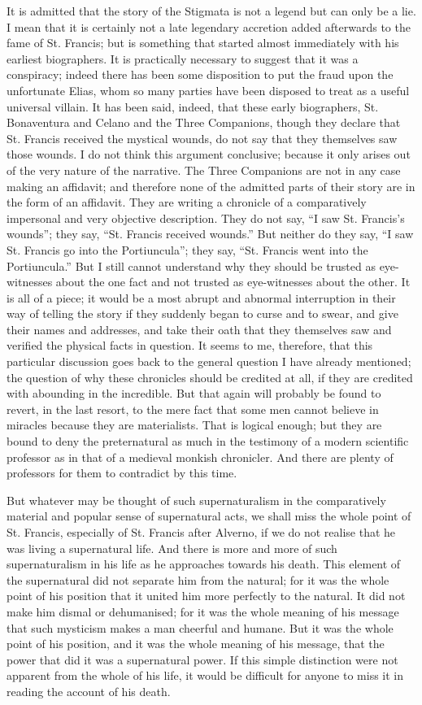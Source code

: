 \documentclass{book}
\begin{document}
It is admitted that the story of the Stigmata is not a legend but can only be a lie. I mean that it is certainly not a late legendary accretion added afterwards to the fame of St. Francis; but is something that started almost immediately with his earliest biographers. It is practically necessary to suggest that it was a conspiracy; indeed there has been some disposition to put the fraud upon the unfortunate Elias, whom so many parties have been disposed to treat as a useful universal villain. It has been said, indeed, that these early biographers, St. Bonaventura and Celano and the Three Companions, though they declare that St. Francis received the mystical wounds, do not say that they themselves saw those wounds. I do not think this argument conclusive; because it only arises out of the very nature of the narrative. The Three Companions are not in any case making an affidavit; and therefore none of the admitted parts of their story are in the form of an affidavit. They are writing a chronicle of a comparatively impersonal and very objective description. They do not say, “I saw St. Francis’s wounds”; they say, “St. Francis received wounds.” But neither do they say, “I saw St. Francis go into the Portiuncula”; they say, “St. Francis went into the Portiuncula.” But I still cannot understand why they should be trusted as eye-witnesses about the one fact and not trusted as eye-witnesses about the other. It is all of a piece; it would be a most abrupt and abnormal interruption in their way of telling the story if they suddenly began to curse and to swear, and give their names and addresses, and take their oath that they themselves saw and verified the physical facts in question. It seems to me, therefore, that this particular discussion goes back to the general question I have already mentioned; the question of why these chronicles should be credited at all, if they are credited with abounding in the incredible. But that again will probably be found to revert, in the last resort, to the mere fact that some men cannot believe in miracles because they are materialists. That is logical enough; but they are bound to deny the preternatural as much in the testimony of a modern scientific professor as in that of a medieval monkish chronicler. And there are plenty of professors for them to contradict by this time.

But whatever may be thought of such supernaturalism in the comparatively material and popular sense of supernatural acts, we shall miss the whole point of St. Francis, especially of St. Francis after Alverno, if we do not realise that he was living a supernatural life. And there is more and more of such supernaturalism in his life as he approaches towards his death. This element of the supernatural did not separate him from the natural; for it was the whole point of his position that it united him more perfectly to the natural. It did not make him dismal or dehumanised; for it was the whole meaning of his message that such mysticism makes a man cheerful and humane. But it was the whole point of his position, and it was the whole meaning of his message, that the power that did it was a supernatural power. If this simple distinction were not apparent from the whole of his life, it would be difficult for anyone to miss it in reading the account of his death.
\end{document}
